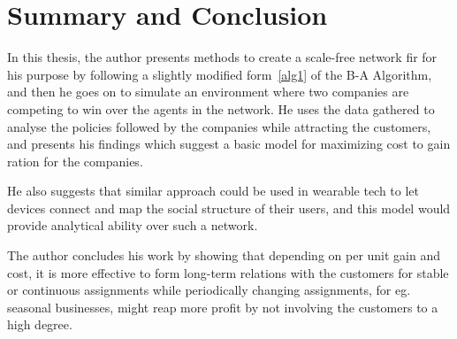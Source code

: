 
\chapter{Summary and Conclusion} %

\label{Chapter7} %


In this thesis, the author presents methods to create a scale-free network fir for his purpose by following a slightly modified form~\ref{alg1} of the B-A Algorithm, and then he goes on to simulate an environment where two companies are competing to win over the agents in the network.
He uses the data gathered to analyse the policies followed by the companies while attracting the customers, and presents his findings which suggest a basic model for maximizing cost to gain ration for the companies.

He also suggests that similar approach could be used in wearable tech to let devices connect and map the social structure of their users, and this model would provide analytical ability over such a network.

The author concludes his work by showing that depending on per unit gain and cost, it is more effective to form long-term relations with the customers for stable or continuous assignments while periodically changing assignments, for eg. seasonal businesses, might reap more profit by not involving the customers to a high degree.